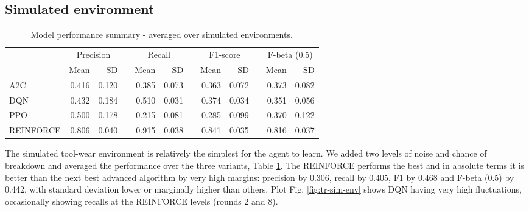 \documentclass[a4paper, 12pt]{article}
\newcommand{\rowspace}[1]{\renewcommand{\arraystretch}{#1}}
\begin{document}
\subsection{Simulated environment}
\begin{table}[!htb]\centering\sffamily
	\rowspace{1.3}
	\begin{tabular}{@{}l rr c rr c rr c rr@{}}
		\arrayrulecolor{black!40}\toprule
		& \multicolumn{2}{c}{Precision} & \phantom{i} & \multicolumn{2}{c}{Recall} & \phantom{i} & \multicolumn{2}{c}{F1-score} & \phantom{i} & \multicolumn{2}{c}{F-beta (0.5)} \\
		\cmidrule{2-3} \cmidrule{5-6} \cmidrule{8-9} \cmidrule{11-12} 
		
		&Mean &SD & &Mean &SD & &Mean &SD& &Mean & SD\\ \midrule
		A2C & 0.416 & 0.120 & &0.385 & 0.073 & & 0.363 & 0.072 & &0.373 &0.082 \\
		DQN & 0.432 & 0.184 & &0.510 & 0.031 & & 0.374 & 0.034 & &0.351 &0.056 \\
		PPO & 0.500 & 0.178 & &0.215 & 0.081 & & 0.285 & 0.099 & &0.370 &0.122 \\
		REINFORCE & 0.806 & 0.040 & &0.915 & 0.038 & & 0.841 & 0.035 & &0.816 &0.037 \\
		
		
		\bottomrule
	\end{tabular}
	\caption{Model performance summary - averaged over simulated environments.}
	\label{tbl:SimulatedEnv}
\end{table}
The simulated tool-wear environment is relatively the simplest for the agent to learn. We added two levels of noise and chance of breakdown and averaged the performance over the three variants, Table \ref{tbl:SimulatedEnv}. The REINFORCE performs the best and in absolute terms it is better than the next best advanced algorithm by very high margins: precision by 0.306, recall by 0.405, F1 by 0.468 and F-beta (0.5) by 0.442, with standard deviation lower or marginally higher than others. Plot Fig. \ref{fig:tr-sim-env} shows DQN having very high fluctuations, occasionally showing recalls at the REINFORCE levels (rounds 2 and 8).
\end{document}
